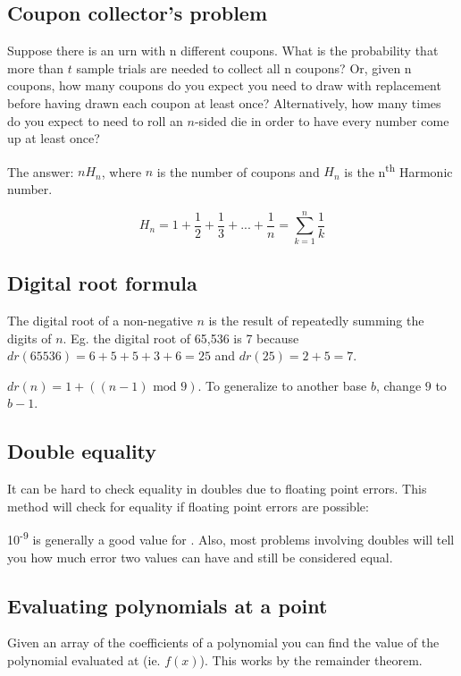 \subsection*{Coupon collector's problem}

Suppose there is an urn with n different coupons. What is the probability that more than $t$ sample trials are needed to collect all n coupons? Or, given n coupons, how many coupons do you expect you need to draw with replacement before having drawn each coupon at least once? Alternatively, how many times do you expect to need to roll an $n$-sided die in order to have every number come up at least once?

The answer: $n H_n$, where $n$ is the number of coupons and $H_n$ is the n\textsuperscript{th} Harmonic number.

$$H_n = 1 + \frac{1}{2} + \frac{1}{3} + ... + \frac{1}{n} = \sum_{k=1}^n \frac{1}{k}$$

\subsection*{Digital root formula}

The digital root of a non-negative $n$ is the result of repeatedly summing the digits of $n$. Eg. the digital root of 65,536 is 7 because $dr(65536) = 6+5+5+3+6 = 25$ and $dr(25) = 2+5 = 7$. 

$dr(n) = 1 + ((n-1) \text{ mod } 9)$. To generalize to another base $b$, change $9$ to $b-1$.

\subsection*{Double equality}

It can be hard to check equality in doubles due to floating point errors. This method will check for equality if floating point errors are possible:



10\textsuperscript{-9} is generally a good value for . Also, most problems involving doubles will tell you how much error two values can have and still be considered equal.

\subsection*{Evaluating polynomials at a point}

Given an array of the coefficients of a polynomial you can find the value of the polynomial evaluated at  (ie. $f(x)$). This works by the remainder theorem.

